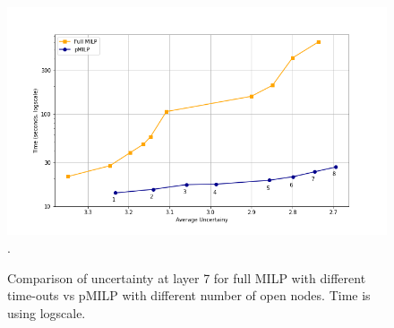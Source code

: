 {\begin{figure}[h!]\hspace*{-0.8cm}
	\includegraphics[scale=0.6]{Layer7_comparison.png}.
	\caption{Comparison of uncertainty at layer 7 for full MILP with different time-outs vs pMILP with different number of open nodes. Time is using logscale.}
	\label{fig4}
\end{figure}



}
